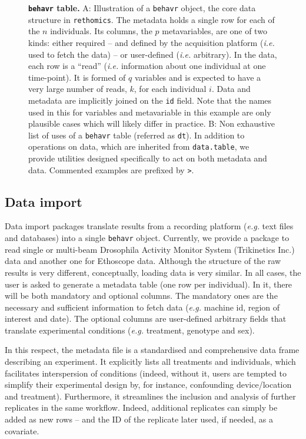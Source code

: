 \documentclass[10pt,letterpaper]{article}\usepackage[]{graphicx}\usepackage[]{color}
\begin{document}
\begin{figure}[!h]
	\caption{{\bf \texttt{behavr} table.}
	A: Illustration of a \texttt{behavr} object, the core data structure in \texttt{rethomics}.
		The metadata holds a single row for each of the $n$ individuals. 
		Its columns, the $p$ metavariables, are one of two kinds: either required -- and defined by the acquisition platform (\emph{i.e.} used to fetch the data) -- or user-defined (\emph{i.e.} arbitrary).
		In the data, each row is a ``read'' (\emph{i.e.} information about one individual at one time-point).
		It is formed of $q$ variables and is expected to have a very large number of reads, $k$, for each individual $i$.
		Data and metadata are implicitly joined on the \texttt{id} field.
		Note that the names used in this for variables and metavariable in this example are only plausible cases which will likely differ in practice. 
		B: Non exhaustive list of uses of a \texttt{behavr} table (referred as \texttt{dt}). 
		In addition to operations on data, which are inherited from \texttt{data.table},
		we provide utilities designed specifically to act on both metadata and data.  
		Commented examples are prefixed by \texttt{>}.
	}
	\label{fig:fig-2}
\end{figure}

\subsection*{Data import}
Data import packages translate results from a recording platform (\emph{e.g.} text files and databases) into a single \texttt{behavr} object.
Currently, we provide a package to read single or multi-beam Drosophila Activity Monitor System (Trikinetics Inc.) data and another one for Ethoscope data\cite{geissmann_ethoscopes:_2017}.
Although the structure of the raw results is very different, conceptually, loading data is very similar.
In all cases, the user is asked to generate a metadata table (one row per individual). 
In it, there will be both mandatory and optional columns.
The mandatory ones are the necessary and sufficient information to fetch data (\emph{e.g.} machine id, region of interest and date). 
The optional columns are user-defined arbitrary fields that translate experimental conditions (\emph{e.g.} treatment, genotype and sex).

In this respect, the metadata file is a standardised and comprehensive data frame describing an experiment.
It explicitly lists all treatments and individuals, which facilitates interspersion of conditions (indeed, without it, users are tempted to simplify their experimental design by, for instance, confounding device/location and treatment).
Furthermore, it streamlines the inclusion and analysis of further replicates in the same workflow.
Indeed, additional replicates can simply be added as new rows -- and the ID of the replicate later used, if needed, as a covariate.	
\end{document}
